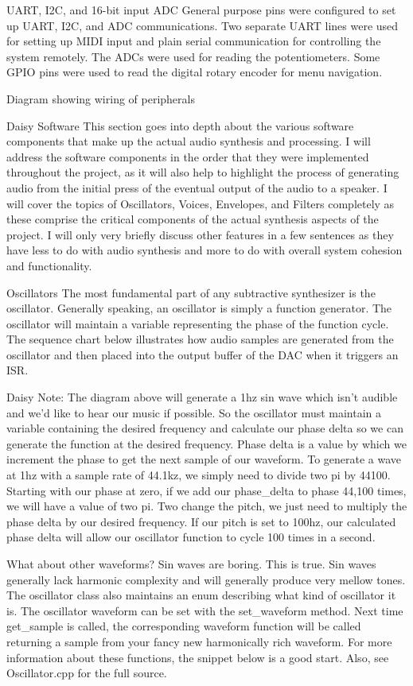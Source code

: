 \documentclass[acmlarge,screen]{acmart}
\begin{document}
UART, I2C, and 16-bit input ADC
General purpose pins were configured to set up UART, I2C, and ADC communications. Two separate UART lines were used for setting up MIDI input and plain serial communication for controlling the system remotely. The ADCs were used for reading the potentiometers. Some GPIO pins were used to read the digital rotary encoder for menu navigation.

Diagram showing wiring of peripherals

Daisy
Software
This section goes into depth about the various software components that make up the actual audio synthesis and processing. I will address the software components in the order that they were implemented throughout the project, as it will also help to highlight the process of generating audio from the initial press of the eventual output of the audio to a speaker. I will cover the topics of Oscillators, Voices, Envelopes, and Filters completely as these comprise the critical components of the actual synthesis aspects of the project. I will only very briefly discuss other features in a few sentences as they have less to do with audio synthesis and more to do with overall system cohesion and functionality.

Oscillators
The most fundamental part of any subtractive synthesizer is the oscillator. Generally speaking, an oscillator is simply a function generator. The oscillator will maintain a variable representing the phase of the function cycle. The sequence chart below illustrates how audio samples are generated from the oscillator and then placed into the output buffer of the DAC when it triggers an ISR.

Daisy
Note: The diagram above will generate a 1hz sin wave which isn't audible and we'd like to hear our music if possible. So the oscillator must maintain a variable containing the desired frequency and calculate our phase delta so we can generate the function at the desired frequency. Phase delta is a value by which we increment the phase to get the next sample of our waveform. To generate a wave at 1hz with a sample rate of 44.1kz, we simply need to divide two pi by 44100. Starting with our phase at zero, if we add our phase\_delta to phase 44,100 times, we will have a value of two pi. Two change the pitch, we just need to multiply the phase delta by our desired frequency. If our pitch is set to 100hz, our calculated phase delta will allow our oscillator function to cycle 100 times in a second.

What about other waveforms? Sin waves are boring.
This is true. Sin waves generally lack harmonic complexity and will generally produce very mellow tones. The oscillator class also maintains an enum describing what kind of oscillator it is. The oscillator waveform can be set with the set\_waveform method. Next time get\_sample is called, the corresponding waveform function will be called returning a sample from your fancy new harmonically rich waveform. For more information about these functions, the snippet below is a good start. Also, see Oscillator.cpp for the full source.
\end{document}
